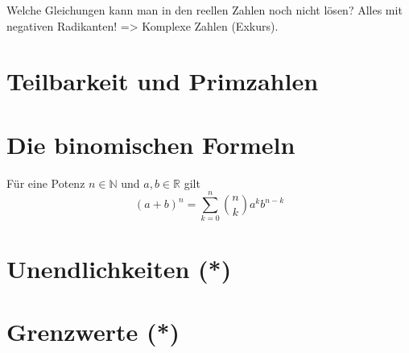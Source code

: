 Welche Gleichungen kann man in den reellen Zahlen noch nicht lösen? Alles mit negativen Radikanten! => Komplexe Zahlen (Exkurs). 

\section{Teilbarkeit und Primzahlen}

\section{Die binomischen Formeln}

\begin{theorem}
    Für eine Potenz \(n \in \mathbb N\) und \(a,b \in \mathbb R\) gilt 
    \begin{equation*}
        (a+b)^n = \sum_{k=0}^n \binom{n}{k}a^k b^{n-k}
    \end{equation*}
\end{theorem}

\section{Unendlichkeiten (*)}

\section{Grenzwerte (*)}